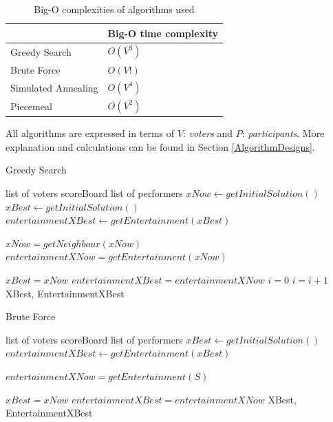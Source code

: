 \documentclass[12pt]{report}
\begin{document}
\begin{table}[H]
\centering
\caption{Big-O complexities of algorithms used}
\label{bigO}
\begin{tabular}{|l|l|}
\hline
        & Big-O time complexity \\ \hline
Greedy Search & $O(V^3)$ \\ \hline
Brute Force & $O(V!)$ \\ \hline
Simulated Annealing & $O(V^4)$ \\ \hline
Piecemeal & $O(V^2)$ \\ \hline
\end{tabular}
\end{table}
All algorithms are expressed in terms of $V$: \textit{voters} and $P$: \textit{participants}. More explanation and calculations can be found in Section \ref{AlgorithmDesigns}.

\begin{algorithm}
\caption{Greedy Search}
\label{greedyPseuodocode}
\begin{algorithmic}[1]
\REQUIRE list of voters
\REQUIRE scoreBoard
\REQUIRE list of performers
\STATE $xNow \leftarrow getInitialSolution()$
\STATE $xBest \leftarrow getInitialSolution()$
\STATE $entertainmentXBest \leftarrow getEntertainment(xBest)$

\STATE $xNow = getNeighbour(xNow)$
\STATE $entertainmentXNow = getEntertainment(xNow)$

\STATE $xBest = xNow$
\STATE $entertainmentXBest = entertainmentXNow$
\STATE $i = 0$
\ENDIF
\STATE $i = i + 1$
\ENDWHILE
\RETURN XBest, EntertainmentXBest
\end{algorithmic}
\end{algorithm}

\begin{algorithm}
\caption{Brute Force}
\label{bruteForcePseudocode}
\begin{algorithmic}[1]
\REQUIRE list of voters
\REQUIRE scoreBoard
\REQUIRE list of performers
\STATE $xBest \leftarrow getInitialSolution()$
\STATE $entertainmentXBest \leftarrow getEntertainment(xBest)$

\STATE $entertainmentXNow = getEntertainment(S)$

\STATE $xBest = xNow$
\STATE $entertainmentXBest = entertainmentXNow$
\ENDIF
\ENDFOR
\RETURN XBest, EntertainmentXBest
\end{algorithmic}
\end{algorithm}
\end{document}
